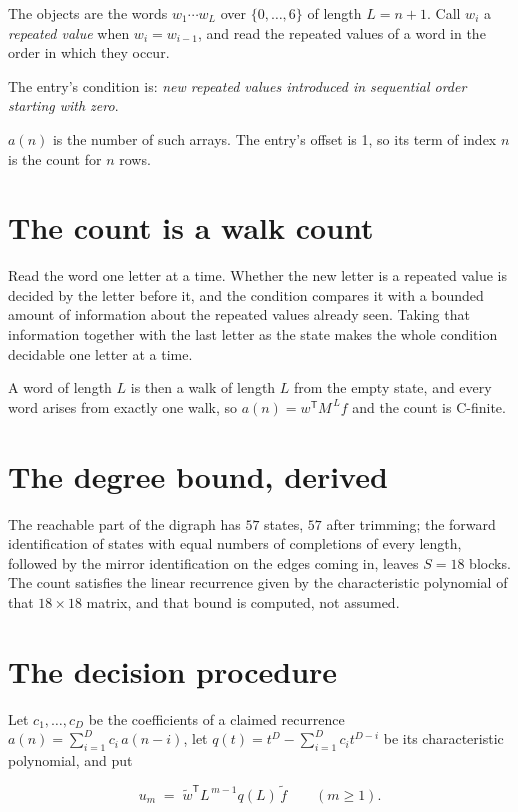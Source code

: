 \documentclass[11pt]{article}
\theoremstyle{definition}
\begin{document}
The objects are the words $w_1\cdots w_L$ over $\{0,\dots,6\}$ of length $L = n + 1$. Call $w_i$ a {\itshape repeated value} when $w_i = w_{i-1}$, and read the repeated values of a word in the order in which they occur.

The entry's condition is: {\itshape new repeated values introduced in sequential order starting with zero}.

$a(n)$ is the number of such arrays. The entry's offset is 1, so its term of index $n$ is the count for $n$ rows.

\section{The count is a walk count}

Read the word one letter at a time. Whether the new letter is a repeated value is decided by the letter before it, and the condition compares it with a bounded amount of information about the repeated values already seen. Taking that information together with the last letter as the state makes the whole condition decidable one letter at a time.

A word of length $L$ is then a walk of length $L$ from the empty state, and every word arises from exactly one walk, so $a(n) = w^{\mathsf T}M^{\,L}f$ and the count is C-finite.

\section{The degree bound, derived}

The reachable part of the digraph has $57$ states, $57$ after trimming; the forward identification of states with equal numbers of completions of every length, followed by the mirror identification on the edges coming in, leaves $S = 18$ blocks. The count satisfies the linear recurrence given by the characteristic polynomial of that $18\times18$ matrix, and that bound is computed, not assumed.

\section{The decision procedure}

Let $c_1,\dots,c_D$ be the coefficients of a claimed recurrence $a(n) = \sum_{i=1}^{D} c_i\,a(n-i)$, let $q(t) = t^{D} - \sum_{i=1}^{D} c_i t^{D-i}$ be its characteristic polynomial, and put

\[u_m \;=\; \tilde w^{\mathsf T} L^{\,m-1} q(L)\,\tilde f \qquad (m \ge 1).\]
\end{document}
